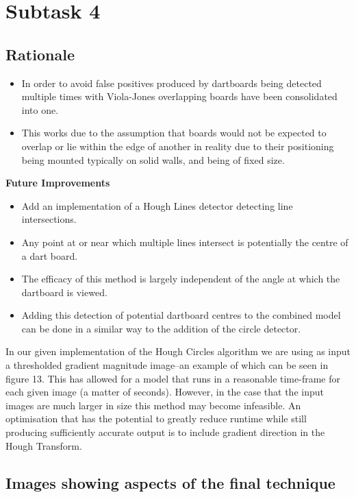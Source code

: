 \documentclass[conference]{IEEEtran}
\begin{document}
\newpage
\section{Subtask 4}

\subsection{Rationale}
\begin{itemize}
	\item In order to avoid false positives produced by dartboards being detected multiple times with Viola-Jones overlapping boards have been consolidated into one.
	\item This works due to the assumption that boards would not be expected to overlap or lie within the edge of another in reality due to their positioning being mounted typically on solid walls, and being of fixed size.
\end{itemize}

\textbf{Future Improvements}
\begin{itemize}
	\item Add an implementation of a Hough Lines detector detecting line intersections. 
	\item Any point at or near which multiple lines intersect is potentially the centre of a dart board.
	\item The efficacy of this method is largely independent of the angle at which the dartboard is viewed.
	\item Adding this detection of potential dartboard centres to the combined model can be done in a similar way to the addition of the circle detector.
\end{itemize}

In our given implementation of the Hough Circles algorithm we are using as input a thresholded gradient magnitude image--an example of which can be seen in figure 13. This has allowed for a model that runs in a reasonable time-frame for each given image (a matter of seconds). However, in the case that the input images are much larger in size this method may become infeasible. An optimisation that has the potential to greatly reduce runtime while still producing sufficiently accurate output is to include gradient direction in the Hough Transform.

\subsection{Images showing aspects of the final technique}
\end{document}
